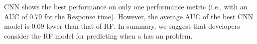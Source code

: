 CNN shows the best performance on only one performance metric (i.e., with an AUC of 0.79 for the Response time). However, the average AUC of the best CNN model is 0.09 lower than that of RF. 
In summary, we suggest that developers consider the RF model for predicting when a \instance has an \inconsistent problem. 


